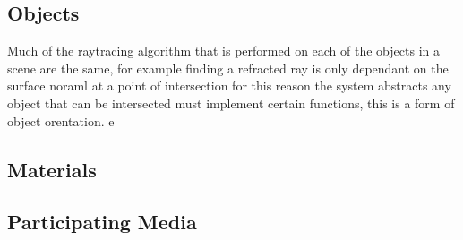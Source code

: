 \begin{figure}
\end{figure}

\subsection{Objects}
Much of the raytracing algorithm that is performed on each of the
objects in a scene are the same, for example finding a refracted
ray is only dependant on the surface noraml at a point of intersection
for this reason the system abstracts any object that can be intersected
must implement certain functions, this is a form of object orentation.
e
\subsection{Materials}
\subsection{Participating Media}
